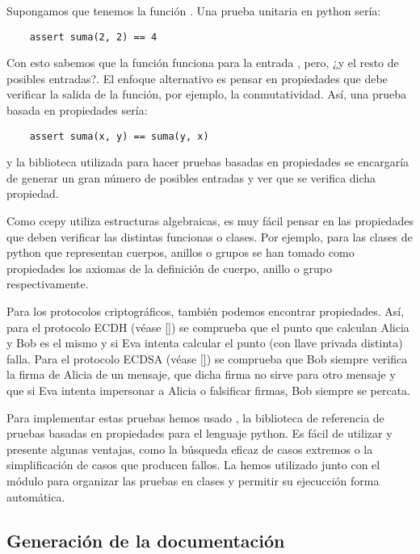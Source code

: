 \begin{ejemplo}
    Supongamos que tenemos la función . Una prueba unitaria en python sería:
    \begin{verbatim}    assert suma(2, 2) == 4\end{verbatim}
    Con esto sabemos que la función  funciona para la entrada , pero, ¿y el resto de posibles entradas?. El enfoque alternativo es pensar en propiedades que debe verificar la salida de la función, por ejemplo, la conmutatividad. Así, una prueba basada en propiedades sería:
    \begin{verbatim}    assert suma(x, y) == suma(y, x)\end{verbatim}
    y la biblioteca utilizada para hacer pruebas basadas en propiedades se encargaría de generar un gran número de posibles entradas y ver que se verifica dicha propiedad.
\end{ejemplo}

Como ccepy utiliza estructuras algebraicas, es muy fácil pensar en las propiedades que deben verificar las distintas funcionas o clases. Por ejemplo, para las clases de python que representan cuerpos, anillos o grupos se han tomado como propiedades los axiomas de la definición de cuerpo, anillo o grupo respectivamente.

Para los protocolos criptográficos, también podemos encontrar propiedades. Así, para el protocolo ECDH (véase \ref{}) se comprueba que el punto que calculan Alicia y Bob es el mismo y si Eva intenta calcular el punto (con llave privada distinta) falla. Para el protocolo ECDSA (véase \ref{}) se comprueba que Bob siempre verifica la firma de Alicia de un mensaje, que dicha firma no sirve para otro mensaje y que si Eva intenta impersonar a Alicia o falsificar firmas, Bob siempre se percata.

Para implementar estas pruebas hemos usado , la biblioteca de referencia de pruebas basadas en propiedades para el lenguaje python. Es fácil de utilizar y presente algunas ventajas, como la búsqueda eficaz de casos extremos o la simplificación de casos que producen fallos. La hemos utilizado junto con el módulo  para organizar las pruebas en clases y permitir su ejecucción forma automática.

\subsection{Generación de la documentación}
\label{sub:Generación de la documentación}


